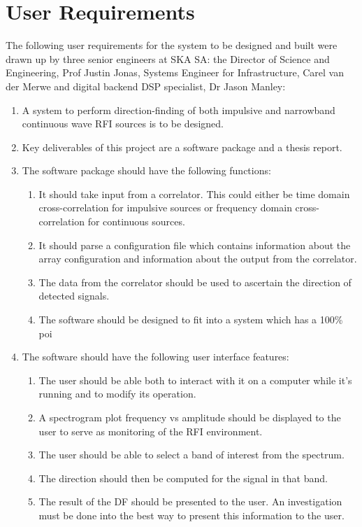 \section{User Requirements}

The following user requirements for the system to be designed and built were drawn up by three senior engineers at SKA SA: the Director of Science and Engineering, Prof Justin Jonas, Systems Engineer for Infrastructure, Carel van der Merwe and digital backend DSP specialist, Dr Jason Manley:
\begin{enumerate}
  \item A system to perform direction-finding of both impulsive and narrowband continuous wave RFI sources is to be designed.
  \item Key deliverables of this project are a software package and a thesis report.
  \item The software package should have the following functions:
    \begin{enumerate}
      \item It should take input from a correlator. This could either be time domain cross-correlation for impulsive sources or frequency domain cross-correlation for continuous sources. 
      \item It should parse a configuration file which contains information about the array configuration and information about the output from the correlator.
      \item The data from the correlator should be used to ascertain the direction of detected signals.
      \item The software should be designed to fit into a system which has a 100\% \gls{poi}
    \end{enumerate}
  \item The software should have the following user interface features:
    \begin{enumerate}
      \item The user should be able both to interact with it on a computer while it's running and to modify its operation.
      \item A spectrogram plot frequency vs amplitude should be displayed to the user to serve as monitoring of the RFI environment.
      \item The user should be able to select a band of interest from the spectrum.
      \item The direction should then be computed for the signal in that band.
      \item The result of the DF should be presented to the user. An investigation must be done into the best way to present this information to the user.

\end{enumerate}
\end{enumerate}

